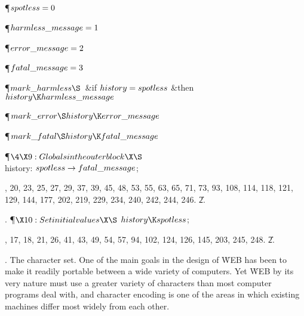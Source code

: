 \Y\P\D {}$\\{spotless}=0$\par
\P\D {}$\\{harmless\_message}=1$\par
\P\D {}$\\{error\_message}=2$\par
\P\D {}$\\{fatal\_message}=3$\Y\par
\P\D {}$\\{mark\_harmless}\S\hbox{}$\ \&{if} $\\{history}=\\{spotless}$ \1%
\&{then}\5
$\\{history}\K\\{harmless\_message}$\2\par
\P\D {}$\\{mark\_error}\S\\{history}\K\\{error\_message}$\par
\P\D {}$\\{mark\_fatal}\S\\{history}\K\\{fatal\_message}$\par
\Y\P$\4\X9:Globals in the outer block\X\S$\6
\4\\{history}: $\\{spotless}\to\\{fatal\_message}$;%
\par
{}, 20, 23, 25, 27, 29, 37, 39, 45, 48, 53, 55, 63, 65, 71, 73, 93, 108,
114, 118, 121, 129, 144, 177, 202, 219, 229, 234, 240, 242, 244, 246.
\U2.\fi

. \P$\X10:Set initial values\X\S$\6
$\\{history}\K\\{spotless}$;\par
{}, 17, 18, 21, 26, 41, 43, 49, 54, 57, 94, 102, 124, 126, 145, 203, 245,
248.
\U2.\fi

.  The character set.
One of the main goals in the design of \.{WEB} has been to make it readily
portable between a wide variety of computers. Yet \.{WEB} by its very
nature must use a greater variety of characters than most computer
programs deal with, and character encoding is one of the areas in which
existing machines differ most widely from each other.

